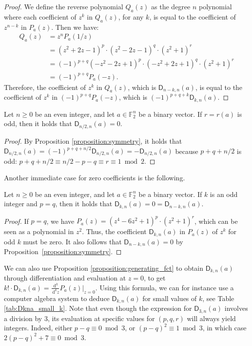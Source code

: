 \documentclass[runningheads,orivec]{llncs}
\newcommand{\dd}{\,\mathrm d}
\newcommand{\Dkna}[3]{\mathsf{D}_{#2,#1}(a)}
\newcommand{\F}{\mathbb{F}}
\let\geq=\geqslant
\begin{document}
    \begin{proof}
    	We define the reverse polynomial  $Q_a(z)$ as the degree $n$ polynomial where each coefficient of $z^k$ in $Q_a(z)$, for any $k$, is equal to the coefficient of $z^{n-k}$ in $P_a(z)$. Then we have:
    	\begin{align*}
    		Q_a(z)&=z^nP_a(1/z)\\
    		&=(z^2+2z-1)^p\cdot(z^2-2z-1)^q\cdot(z^2+1)^r\\
    		&=(-1)^{p+q}(-z^2-2z+1)^p\cdot(-z^2+2z+1)^q\cdot(z^2+1)^r\\
    		&=(-1)^{p+q}P_a(-z).
    	\end{align*}
    	Therefore, the coefficient of $z^k$ in $Q_a(z)$, which is $\Dkna n{n-k}a$, is equal to the coefficient of $z^k$ in $(-1)^{p+q}P_a(-z)$, which is $(-1)^{p+q+k}\Dkna nka$.
    \end{proof}
    
    \begin{corollary}
        Let $n\geq 0$ be an even integer, and let $a\in\F_2^n$ be a binary vector. If $r=r(a)$ is odd, then it holds that $\Dkna n{n/2}a=0$.
    \end{corollary}
    
    \begin{proof}
    	By Proposition \ref{proposition:symmetry}, it holds that $\Dkna n{n/2}a=(-1)^{p+q+n/2}\Dkna n{n/2}a=-\Dkna n{n/2}a$ because $p+q+n/2$ is odd: $p+q+n/2\equiv n/2-p-q\equiv r\equiv 1\bmod 2$.
    \end{proof}
    
    Another immediate case for zero coefficients is the following.
    
    \begin{proposition}
        Let $n\geq 0$ be an even integer, and let $a\in\F_2^n$ be a binary vector. If $k$ is an odd integer and  $p=q$, then it holds that $\Dkna nka=0=\Dkna n{n-k}a$.
    \end{proposition}
    
    \begin{proof}
        If $p=q$, we have $P_a(z)=(z^4-6z^2+1)^p\cdot(z^2+1)^r$, which can be seen as a polynomial in $z^2$. Thus, the coefficient $\Dkna nka$ in $P_a(z)$ of $z^k$ for odd $k$ must be zero. It also follows that $\Dkna n{n-k}a=0$ by Proposition~\ref{proposition:symmetry}.
    \end{proof}
    
    \begin{remark}\label{remark:D_nka_differentiation}
        We can also use Proposition \ref{proposition:generating_fct} to obtain $\Dkna nka$ through differentiation and evaluation at $z=0$, to get $k!\cdot\Dkna nka=\frac{\dd^k}{\dd^k z}P_a(z)\vert_{z=0}$. Using this formula, we can for instance use a computer algebra system to deduce $\Dkna nka$ for small values of $k$, see Table \ref{tab:Dkna_small_k}. Note that even though the expression for $\Dkna n3a$ involves a division by $3$, its evaluation at specific values for $(p,q,r)$ will always yield integers. Indeed, either $p-q\equiv 0\bmod 3$, or $(p-q)^2\equiv 1\bmod 3$, in which case $2(p-q)^2+7\equiv 0\bmod 3$.
    \end{remark}
    
\end{document}
